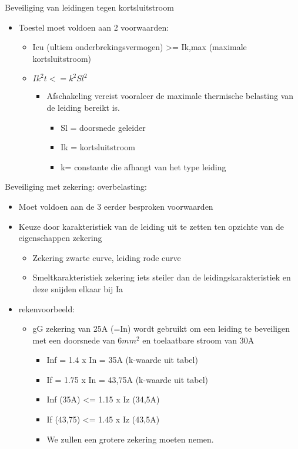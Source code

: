 \documentclass[12pt]{article}
\begin{document}
Beveiliging van leidingen tegen kortsluitstroom\begin{itemize}
\item Toestel moet voldoen aan 2 voorwaarden:\begin{itemize}
    \item Icu (ultiem onderbrekingsvermogen) >= Ik,max (maximale kortsluitstroom)
    \item $Ik^2t <=k^2Sl^2$\begin{itemize}
        \item Afschakeling vereist vooraleer de maximale thermische belasting van de leiding bereikt is.\begin{itemize}
            \item Sl = doorsnede geleider
            \item Ik = kortsluitstroom
            \item k= constante die afhangt van het type leiding
        \end{itemize}
    \end{itemize}
\end{itemize}
\end{itemize}
Beveiliging met zekering: overbelasting:\begin{itemize}
    \item Moet voldoen aan de 3 eerder besproken voorwaarden
    \item Keuze door karakteristiek van de leiding uit te zetten ten opzichte van de eigenschappen zekering\begin{itemize}
        \item Zekering zwarte curve, leiding rode curve
        \item Smeltkarakteristiek zekering iets steiler dan de leidingskarakteristiek en deze snijden elkaar bij Ia
    \end{itemize}
    \item rekenvoorbeeld:\begin{itemize}
        \item gG zekering van 25A (=In) wordt gebruikt om een leiding te beveiligen met een doorsnede van 6$mm^2$ en toelaatbare stroom van 30A\begin{itemize}
            \item Inf = 1.4 x In = 35A (k-waarde uit tabel)
            \item If = 1.75 x In = 43,75A (k-waarde uit tabel)
            \item[]Inf (35A) <= 1.15 x Iz (34,5A)
            \item[]If (43,75) <= 1.45 x Iz (43,5A)
            \item[] We zullen een grotere zekering moeten nemen.
        \end{itemize}
    \end{itemize}
\end{itemize}
\end{document}

